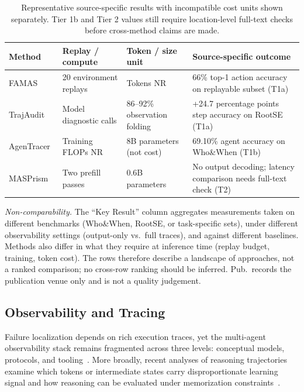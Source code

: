 \begin{table}[t]
\centering
\caption{Representative source-specific results with incompatible cost units shown separately. Tier 1b and Tier 2 values still require location-level full-text checks before cross-method claims are made.}
\label{tab:localization_cost}
\footnotesize
\begin{tabularx}{\textwidth}{@{}p{}p{}p{}X@{}}
\toprule
\textbf{Method} & \textbf{Replay / compute} & \textbf{Token / size unit} & \textbf{Source-specific outcome} \\
\midrule
FAMAS~\cite{famas2025} & 20 environment replays & Tokens NR & 66\% top-1 action accuracy on replayable subset (T1a) \\
TrajAudit~\cite{trajaudit2026} & Model diagnostic calls & 86--92\% observation folding & +24.7 percentage points step accuracy on RootSE (T1a) \\
AgenTracer~\cite{agentracer2026} & Training FLOPs NR & 8B parameters (not cost) & 69.10\% agent accuracy on Who\&When (T1b) \\
MASPrism~\cite{masprism2026} & Two prefill passes & 0.6B parameters & No output decoding; latency comparison needs full-text check (T2) \\
\bottomrule
\end{tabularx}
\end{table}
\vspace{-2pt}
{\footnotesize \emph{Non-comparability.} The ``Key Result'' column aggregates measurements taken on different benchmarks (Who\&When, RootSE, or task-specific sets), under different observability settings (output-only vs.\ full traces), and against different baselines. Methods also differ in what they require at inference time (replay budget, training, token cost). The rows therefore describe a landscape of approaches, not a ranked comparison; no cross-row ranking should be inferred. Pub.\ records the publication venue only and is not a quality judgement.}

\subsection{Observability and Tracing}\label{sec:diag_obs}

Failure localization depends on rich execution traces, yet the multi-agent observability stack remains fragmented across three levels: conceptual models, protocols, and tooling~\cite{aiobsmultilayer2026}. More broadly, recent analyses of reasoning trajectories examine which tokens or intermediate states carry disproportionate learning signal and how reasoning can be evaluated under memorization constraints~\cite{jiang2026rocktokens,jiang-ferraro-2026-beyond}.

